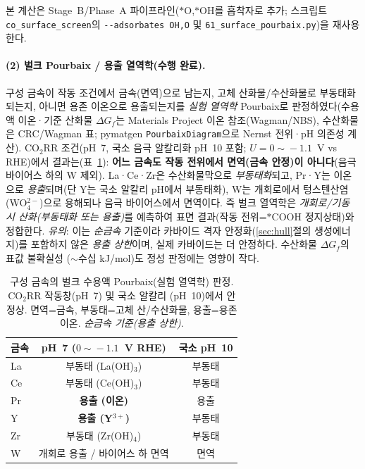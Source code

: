 \documentclass[11pt,a4paper]{report}
\begin{document}
본 계산은 Stage~B/Phase~A 파이프라인($*$O,$*$OH를 흡착자로 추가; 스크립트
\texttt{co\_surface\_screen}의 \texttt{-{}-adsorbates OH,O} 및 \texttt{61\_surface\_pourbaix.py})을
재사용한다.

\paragraph{(2) 벌크 Pourbaix / 용출 열역학(수행 완료).} 구성 금속이 작동 조건에서 금속(면역)으로
남는지, 고체 산화물/수산화물로 부동태화되는지, 아니면 용존 이온으로 용출되는지를 \emph{실험 열역학}
Pourbaix로 판정하였다(수용액 이온·기준 산화물 $\Delta G_f$는 Materials Project 이온 참조(Wagman/NBS),
수산화물은 CRC/Wagman 표; pymatgen \texttt{PourbaixDiagram}으로 Nernst 전위·pH 의존성 계산). CO$_2$RR
조건(pH~7, 국소 음극 알칼리화 pH~10 포함; $U=0\!\sim\!-1.1$~V vs RHE)에서 결과는(표~\ref{tab:pourbaix}):
\textbf{어느 금속도 작동 전위에서 면역(금속 안정)이 아니다}(음극 바이어스 하의 W 제외). La·Ce·Zr은
수산화물막으로 \emph{부동태화}되고, Pr·Y는 이온으로 \emph{용출}되며(단 Y는 국소 알칼리 pH에서 부동태화),
W는 개회로에서 텅스텐산염(WO$_4^{2-}$)으로 용해되나 음극 바이어스에서 면역이다. 즉 벌크 열역학은
\emph{개회로/기동 시 산화(부동태화 또는 용출)}를 예측하여 표면 결과(작동 전위=$*$COOH 정지상태)와
정합한다. \emph{유의}: 이는 \emph{순금속} 기준이라 카바이드 격자 안정화(\ref{sec:hull}절의 생성에너지)를
포함하지 않은 \emph{용출 상한}이며, 실제 카바이드는 더 안정하다. 수산화물 $\Delta G_f$의 표값 불확실성
($\sim$수십 kJ/mol)도 정성 판정에는 영향이 작다.

\begin{table}[t]
\centering
\caption{구성 금속의 벌크 수용액 Pourbaix(실험 열역학) 판정. CO$_2$RR 작동창(pH~7) 및 국소 알칼리
(pH~10)에서 안정상. 면역=금속, 부동태=고체 산/수산화물, 용출=용존 이온. \emph{순금속 기준(용출 상한)}.}
\label{tab:pourbaix}
\small
\begin{tabular}{lcc}
\hline
금속 & pH~7 ($0\!\sim\!-1.1$~V RHE) & 국소 pH~10 \\
\hline
La & 부동태 (La(OH)$_3$) & 부동태 \\
Ce & 부동태 (Ce(OH)$_3$) & 부동태 \\
Pr & \textbf{용출 (이온)} & 용출 \\
Y  & \textbf{용출 (Y$^{3+}$)} & 부동태 \\
Zr & 부동태 (Zr(OH)$_4$) & 부동태 \\
W  & 개회로 용출 / 바이어스 하 면역 & 면역 \\
\hline
\end{tabular}
\end{table}
\end{document}
